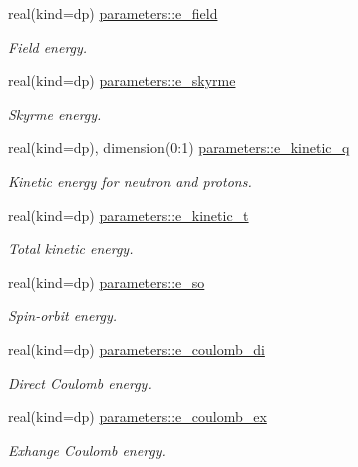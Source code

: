 \begin{DoxyCompactItemize}
real(kind=dp) \mbox{\hyperlink{group__WS__PROPERTIES_gaba6452c229b473b375ee695573482098}{parameters\+::e\+\_\+field}}
\begin{DoxyCompactList}\small\item\em Field energy. \end{DoxyCompactList}\item 
real(kind=dp) \mbox{\hyperlink{group__WS__PROPERTIES_ga5683bdc3d77765f0e39d27c0a8c07e12}{parameters\+::e\+\_\+skyrme}}
\begin{DoxyCompactList}\small\item\em Skyrme energy. \end{DoxyCompactList}\item 
real(kind=dp), dimension(0\+:1) \mbox{\hyperlink{group__WS__PROPERTIES_ga488ae2b962fd84ebc096feb2d9b86bdb}{parameters\+::e\+\_\+kinetic\+\_\+q}}
\begin{DoxyCompactList}\small\item\em Kinetic energy for neutron and protons. \end{DoxyCompactList}\item 
real(kind=dp) \mbox{\hyperlink{group__WS__PROPERTIES_ga6a028c7097c7f19416111f67d7751e0a}{parameters\+::e\+\_\+kinetic\+\_\+t}}
\begin{DoxyCompactList}\small\item\em Total kinetic energy. \end{DoxyCompactList}\item 
real(kind=dp) \mbox{\hyperlink{group__WS__PROPERTIES_ga1be7ac7adf47738e0cf4ada759e3b038}{parameters\+::e\+\_\+so}}
\begin{DoxyCompactList}\small\item\em Spin-\/orbit energy. \end{DoxyCompactList}\item 
real(kind=dp) \mbox{\hyperlink{group__WS__PROPERTIES_gad3cbae007568a7ca3045ba174fda13e0}{parameters\+::e\+\_\+coulomb\+\_\+di}}
\begin{DoxyCompactList}\small\item\em Direct Coulomb energy. \end{DoxyCompactList}\item 
real(kind=dp) \mbox{\hyperlink{group__WS__PROPERTIES_ga089d9dd6556d4555570eed570f9f71f3}{parameters\+::e\+\_\+coulomb\+\_\+ex}}
\begin{DoxyCompactList}\small\item\em Exhange Coulomb energy. \end{DoxyCompactList}\item 

\end{DoxyCompactItemize}
